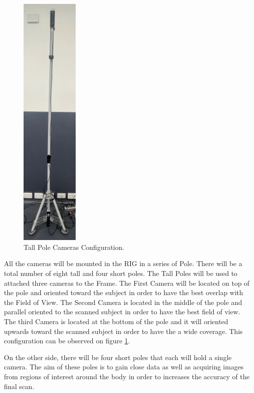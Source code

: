 \documentclass[12pt]{report}
\begin{document}
\begin{figure}
  \begin{center}
    \includegraphics[width=0.25\textwidth]{IMG_5895_cropped.jpg}
  \end{center}
  \caption{Tall Pole Cameras Configuration.}
  \label{fig:poles_camera_tall}
\end{figure}
All the cameras will be mounted in the RIG in a series of Pole. There will be a total number of eight tall and four short poles.
The Tall Poles will be used to attached three cameras to the Frame. The First Camera will be located on top of the pole and oriented toward the subject in order to have the best overlap with the Field of View.
The Second Camera is located in the middle of the pole and parallel oriented to the scanned subject in order to have the best field of view. 
The third Camera is located at the bottom of the pole and it will oriented upwards toward the scanned subject in order to have the a wide coverage. 
This configuration can be observed on figure \ref{fig:poles_camera_tall}.

On the other side, there will be four short poles that each will hold a single camera. 
The aim of these poles is to gain close data as well as acquiring images from regions of interest around the body in order to increases
the accuracy of the final scan. 
\end{document}

